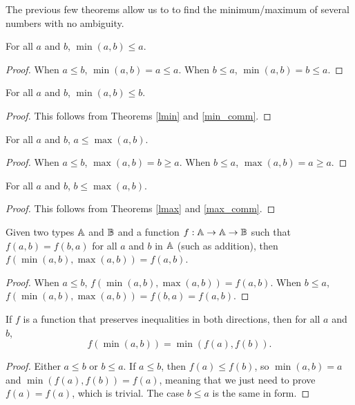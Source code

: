 \documentclass[../../math.tex]{subfiles}
\begin{document}
The previous few theorems allow us to to find the minimum/maximum of several
numbers with no ambiguity.

\begin{theorem} \label{lmin}
    For all $a$ and $b$, $\min(a, b) \leq a$.
\end{theorem}
\begin{proof}
    When $a \leq b$, $\min(a, b) = a \leq a$.  When $b \leq a$, $\min(a, b) = b
    \leq a$.
\end{proof}

\begin{theorem} \label{rmin}
    For all $a$ and $b$, $\min(a, b) \leq b$.
\end{theorem}
\begin{proof}
    This follows from Theorems \ref{lmin} and \ref{min_comm}.
\end{proof}

\begin{theorem} \label{lmax}
    For all $a$ and $b$, $a \leq \max(a, b)$.
\end{theorem}
\begin{proof}
    When $a \leq b$, $\max(a, b) = b \geq a$.  When $b \leq a$, $\max(a, b) = a
    \geq a$.
\end{proof}

\begin{theorem} \label{rmax}
    For all $a$ and $b$, $b \leq \max(a, b)$.
\end{theorem}
\begin{proof}
    This follows from Theorems \ref{lmax} and \ref{max_comm}.
\end{proof}

\begin{theorem}
    Given two types $\mathbb{A}$ and $\mathbb{B}$ and a function $f : \mathbb{A} \rightarrow \mathbb{A}
    \rightarrow \mathbb{B}$ such that $f(a, b) = f(b, a)$ for all $a$ and $b$ in $\mathbb{A}$
    (such as addition), then $f(\min(a, b), \max(a, b)) = f(a, b)$.
\end{theorem}
\begin{proof}
    When $a \leq b$, $f(\min(a, b), \max(a, b)) = f(a, b)$.  When $b \leq a$,
    $f(\min(a, b), \max(a, b)) = f(b, a) = f(a, b)$.
\end{proof}

\begin{theorem} \label{homo-min}
    If $f$ is a function that preserves inequalities in both directions, then
    for all $a$ and $b$,
    \[
        f(\min(a, b)) = \min(f(a), f(b)).
    \]
\end{theorem}
\begin{proof}
    Either $a \leq b$ or $b \leq a$.  If $a \leq b$, then $f(a) \leq f(b)$, so
    $\min(a, b) = a$ and $\min(f(a), f(b)) = f(a)$, meaning that we just need to
    prove $f(a) = f(a)$, which is trivial.  The case $b \leq a$ is the same in
    form.
\end{proof}
\end{document}
